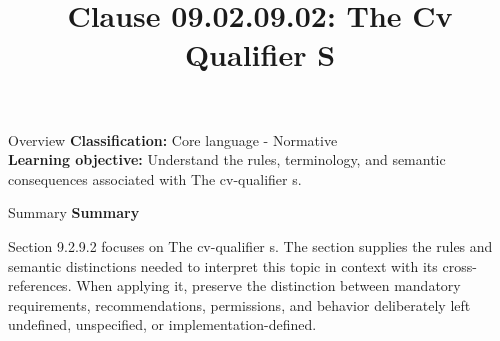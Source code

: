 \documentclass[10pt,letterpaper]{article}
\title{Clause 09.02.09.02: The Cv Qualifier S}
\author{}
\date{}
\begin{document}
\maketitle
\begin{CornellOverviewBox}{Overview}
\textbf{Classification:} Core language - Normative\\[2pt]
\textbf{Learning objective:} Understand the rules, terminology, and semantic consequences associated with The cv-qualifier s.
\end{CornellOverviewBox}\begin{CornellSummaryBox}{Summary}
{\sffamily\bfseries\color{Accent} Summary}\par\vspace{3pt}Section 9.2.9.2 focuses on The cv-qualifier s. The section supplies the rules and semantic distinctions needed to interpret this topic in context with its cross-references. When applying it, preserve the distinction between mandatory requirements, recommendations, permissions, and behavior deliberately left undefined, unspecified, or implementation-defined.
\end{CornellSummaryBox}
\end{document}
